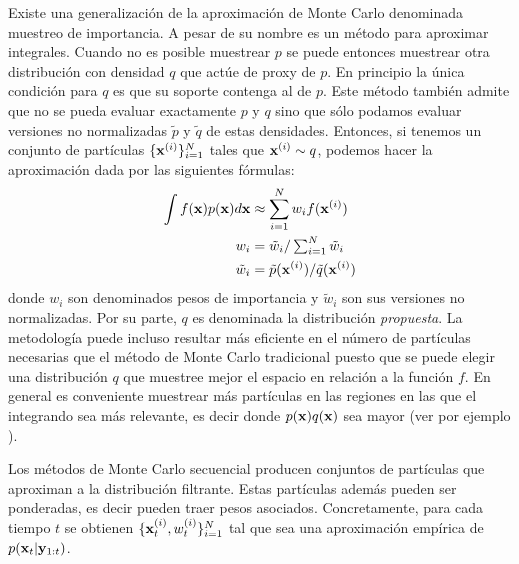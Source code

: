 Existe una generalización de la aproximación de Monte Carlo denominada muestreo de importancia. A pesar de su nombre es un método para aproximar integrales. Cuando no es posible muestrear $p$ se puede entonces muestrear otra distribución con densidad $q$ que actúe de proxy de $p$. En principio la única condición para $q$ es que su soporte contenga al de $p$. Este método también admite que no se pueda evaluar exactamente $p$ y $q$ sino que sólo podamos evaluar versiones no normalizadas $\tilde{p}$ y $\tilde{q}$ de estas densidades. Entonces, si tenemos un conjunto de partículas $\{\mathbf{x}^{(i)}\}_{i=1}^N$ tales que $\mathbf{x}^{(i)}\sim q$, podemos hacer la aproximación dada por las siguientes fórmulas:
\begin{align*}
    \int f(\mathbf{x}) p(\mathbf{x}) d \mathbf{x} &\approx \sum_{i=1}^N w_i f(\mathbf{x}^{(i)}) \\
    w_i &= \tilde{w}_i / \textstyle\sum_{i=1}^N \tilde{w}_i \\
    \tilde{w}_i &= \tilde{p}(\mathbf{x}^{(i)}) / \tilde{q}(\mathbf{x}^{(i)})
\end{align*}
donde $w_i$ son denominados pesos de importancia y $\tilde{w}_i$ son sus versiones no normalizadas. Por su parte, $q$ es denominada la distribución \textit{propuesta}. La metodología puede incluso resultar más eficiente en el número de partículas necesarias que el método de Monte Carlo tradicional puesto que se puede elegir una distribución $q$ que muestree mejor el espacio en relación a la función $f$. En general es conveniente muestrear más partículas en las regiones en las que el integrando sea más relevante, es decir donde $p(\mathbf{x}) q(\mathbf{x})$ sea mayor (ver por ejemplo \cite{Murphy2012,Mackay2003}).

Los métodos de Monte Carlo secuencial producen conjuntos de partículas que aproximan a la distribución filtrante. Estas partículas además pueden ser ponderadas, es decir pueden traer pesos asociados. Concretamente, para cada tiempo $t$ se obtienen $\{\mathbf{x}_t^{(i)}, w_t^{(i)}\}_{i=1}^{N}$ tal que sea una aproximación empírica de $p(\mathbf{x}_t | \mathbf{y}_{1:t})$.

